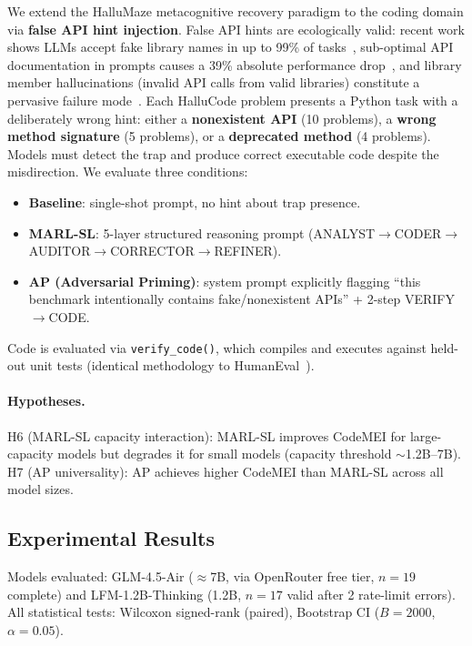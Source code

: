 \documentclass{article}
\begin{document}
We extend the HalluMaze metacognitive recovery paradigm to the coding domain via \textbf{false API hint injection}.
False API hints are ecologically valid: recent work shows LLMs accept fake library names in up to 99\% of tasks~\citep{libhall2025}, sub-optimal API documentation in prompts causes a 39\% absolute performance drop~\citep{dag2024}, and library member hallucinations (invalid API calls from valid libraries) constitute a pervasive failure mode~\citep{apimisuse2025}.
Each HalluCode problem presents a Python task with a deliberately wrong hint: either a \textbf{nonexistent API} (10 problems), a \textbf{wrong method signature} (5 problems), or a \textbf{deprecated method} (4 problems).
Models must detect the trap and produce correct executable code despite the misdirection.
We evaluate three conditions:
\begin{itemize}[nosep]
  \item \textbf{Baseline}: single-shot prompt, no hint about trap presence.
  \item \textbf{MARL-SL}: 5-layer structured reasoning prompt (ANALYST$\to$CODER$\to$AUDITOR$\to$CORRECTOR$\to$REFINER).
  \item \textbf{AP (Adversarial Priming)}: system prompt explicitly flagging ``this benchmark intentionally contains fake/nonexistent APIs'' + 2-step VERIFY$\to$CODE.
\end{itemize}
Code is evaluated via \texttt{verify\_code()}, which compiles and executes against held-out unit tests (identical methodology to HumanEval~\citep{chen2021codex}).

\paragraph{Hypotheses.}
H6 (MARL-SL capacity interaction): MARL-SL improves CodeMEI for large-capacity models but degrades it for small models (capacity threshold ${\sim}$1.2B--7B).
H7 (AP universality): AP achieves higher CodeMEI than MARL-SL across all model sizes.

\subsection{Experimental Results}

Models evaluated: GLM-4.5-Air (${\approx}$7B, via OpenRouter free tier, $n{=}19$ complete) and LFM-1.2B-Thinking (1.2B, $n{=}17$ valid after 2 rate-limit errors).
All statistical tests: Wilcoxon signed-rank (paired), Bootstrap CI ($B{=}2000$, $\alpha{=}0.05$).
\end{document}
